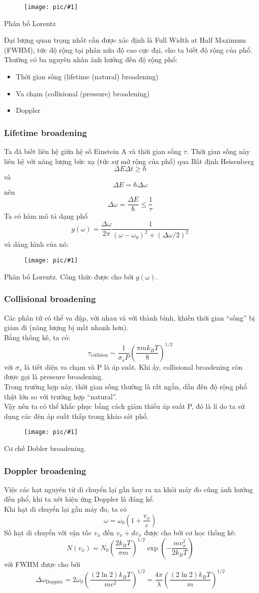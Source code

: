 \documentclass{report}
\newcommand{\image}[1]{
\begin{figure}[H]
	\centering
	\texttt{[image: pic/\#1]}
	\label{#1}
\end{figure}
}
\begin{document}
\image{cauchy.png}{Phân bố Lorentz}

Đại lượng quan trọng nhất cần được xác định là Full Width at Half Maximum (FWHM), tức độ rộng tại phân nửa độ cao cực đại, cho ta biết độ rộng của phổ.\\
Thường có ba nguyên nhân ảnh hưởng đến độ rộng phổ:
\begin{itemize}
	\item Thời gian sống (lifetime (natural) broadening)
	\item Va chạm (collisional (pressure) broadening)
	\item Doppler
\end{itemize}
\subsubsection{Lifetime broadening}
Ta đã biết liên hệ giữa hệ số Einstein A và thời gian sống $\tau$. Thời gian sống này liên hệ với năng lượng bức xạ (tức sự mở rộng của phổ) qua Bất định Heisenberg $$\Delta E\Delta t \geq \hbar$$
và $$\Delta E = \hbar\Delta\omega$$
nên $$\Delta \omega=\frac{\Delta E}{\hbar} \leq \frac{1}{\tau}$$
Ta có hàm mô tả dạng phổ $$g(\omega) = \frac{\Delta\omega}{2\pi} \frac{1}{(\omega - \omega_0)^2 + (\Delta\omega/2)^2}$$
và dáng hình của nó:
\image{g(w).png}{Phân bố Lorentz. Công thức được cho bởi $g(\omega)$.}
\subsubsection{Collisional broadening}
Các phân tử có thể va đập, với nhau và với thành bình, khiến thời gian ``sống'' bị giảm đi (năng lượng bị mất nhanh hơn).\\
Bằng thống kê, ta có: $$\tau_{\text{collision}} \sim \frac{1}{\sigma_s P} \left( \frac{\pi m k_B T}{8} \right)^{1/2}$$ với $\sigma_s$ là tiết diện va chạm và P là áp suất. Khi ấy, collisional broadening còn được gọi là pressure broadening.\\
Trong trường hợp này, thời gian sống thường là rất ngắn, dẫn đến độ rộng phổ thật lớn so với trường hợp ``natural''.\\
Vậy nên ta có thể khắc phục bằng cách giảm thiểu áp suất P, đó là lí do ta sử dụng các đèn áp suất thấp trong khảo sát phổ.\\
\image{pbroad.png}{Cơ chế Dobler broadening.}
\subsubsection{Doppler broadening}
Việc các hạt nguyên tử di chuyển lại gần hay ra xa khỏi máy đo cũng ảnh hưởng đến phổ, khi ta xét hiệu ứng Doppler là đáng kể. \\
Khi hạt di chuyển lại gần máy đo, ta có $$\omega=\omega_0\left(1+\frac{v_x}{c}\right)$$
Số hạt di chuyển với vận tốc $v_x$ đến $v_x+dv_x$ được cho bởi cơ học thống kê: $$N(v_x) = N_0 \left( \frac{2k_B T}{\pi m} \right)^{1/2} \exp \left( -\frac{m v_x^2}{2k_B T} \right)$$ với FWHM được cho bởi $$\Delta \omega_{\text{Doppler}} = 2 \omega_0 \left( \frac{(2 \ln 2) k_B T}{mc^2} \right)^{1/2} = \frac{4 \pi}{\lambda} \left( \frac{(2 \ln 2) k_B T}{m} \right)^{1/2}$$
\end{document}
